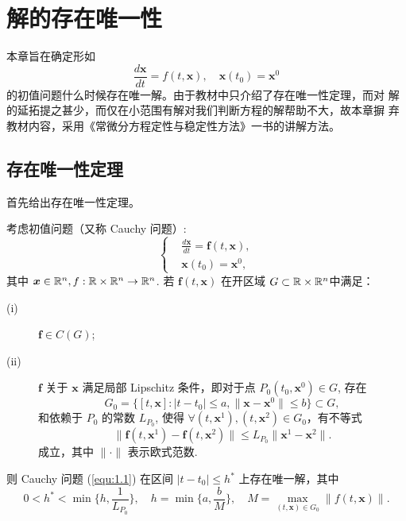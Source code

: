 \chapter{解的存在唯一性}
本章旨在确定形如
\[
\frac{d\bm{x}}{dt}=f(t,\bm{x}),\quad \bm{x}(t_0)=\bm{x}^0
\]
的初值问题什么时候存在唯一解。由于教材中只介绍了存在唯一性定理，而对
解的延拓提之甚少，而仅在小范围有解对我们判断方程的解帮助不大，故本章摒
弃教材内容，采用《常微分方程定性与稳定性方法》一书的讲解方法。

\section{存在唯一性定理}\label{sec:1.1}
首先给出存在唯一性定理。
\begin{thm}[(存在唯一性定理)]\label{thm:1.1.1}
考虑初值问题（又称 Cauchy 问题）:
\begin{equation}\label{equ:1.1}
    \left\{
        \begin{aligned}
            &\frac{d\bm{x}}{dt}=\bm{f}(t,\bm{x}),\\
            &\bm{x}(t_0)=\bm{x}^0,
        \end{aligned}
    \right.
\end{equation}
其中 $\bm{x}\in\mathbb{R}^n, f:\mathbb{R}\times\mathbb{R}^n\to\mathbb{R}^n$. 若 $\bm{f}(t,\bm{x})$ 在开区域 $G\subset\mathbb{R}\times\mathbb{R}^n$中满足：
\begin{description}
    \item[(i)] $\bm{f}\in C(G)$;
    \item[(ii)] $\bm{f}$ 关于 $\bm{x}$ 满足局部 Lipschitz 条件，即对于点 $P_0(t_0,\bm{x}^0)\in G$, 存在
    \[
    G_0=\{[t,\bm{x}]:|t-t_0|\leq a,\|\bm{x}-\bm{x}^0\|\leq b\}\subset G,
    \]
    和依赖于 $P_0$ 的常数 $L_{P_0}$, 使得 $\forall (t,\bm{x}^1),(t,\bm{x}^2)\in G_0$，有不等式
    \begin{equation}\label{equ:1.2}
        \|\bm{f}(t,\bm{x}^1)-\bm{f}(t,\bm{x}^2)\|\leq L_{P_0}\|\bm{x}^1-\bm{x}^2\|.
    \end{equation}
    成立，其中 $\|\cdot\|$ 表示欧式范数.
\end{description}

则 Cauchy 问题 (\ref{equ:1.1}) 在区间 $|t-t_0|\leq h^*$ 上存在唯一解，其中
\[
0<h^*<\min\{h,\frac{1}{L_{P_0}}\},\quad h=\min\{a,\frac{b}{M}\},\quad M=\max_{(t,\bm{x})\in G_0}\|f(t,\bm{x})\|.
\]
\end{thm}

